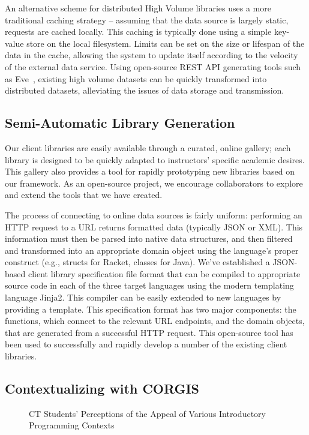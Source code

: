 An alternative scheme for distributed High Volume libraries uses a more traditional caching strategy -- assuming that the data source is largely static, requests are cached locally.
This caching is typically done using a simple key-value store on the local filesystem.
Limits can be set on the size or lifespan of the data in the cache, allowing the system to update itself according to the velocity of the external data service.
Using open-source REST API generating tools such as Eve~\cite{Eve}, existing high volume datasets can be quickly transformed into distributed datasets, alleviating the issues of data storage and transmission.

\subsection{Semi-Automatic Library Generation}

Our client libraries are easily available through a curated, online gallery; each library is designed to be quickly adapted to instructors' specific academic desires. 
This gallery also provides a tool for rapidly prototyping new libraries based on our framework.
As an open-source project, we encourage collaborators to explore and extend the tools that we have created.

The process of connecting to online data sources is fairly uniform: performing an HTTP request to a URL returns formatted data (typically JSON or XML). 
This information must then be parsed into native data structures, and then filtered and transformed into an appropriate domain object using the language's proper construct (e.g., structs for Racket, classes for Java).
We've established a JSON-based client library specification file format that can be compiled to appropriate source code in each of the three target languages using the modern templating language Jinja2. 
This compiler can be easily extended to new languages by providing a template.
This specification format has two major components: the functions, which connect to the relevant URL endpoints, and the domain objects, that are generated from a successful HTTP request. 
This open-source tool has been used to successfully and rapidly develop a number of the existing client libraries.

\subsection{Contextualizing with CORGIS}

\begin{figure}
		\begin{center}
		\end{center}
		\caption{CT Students' Perceptions of the Appeal of Various Introductory Programming Contexts}
		\label{fig-contexts-compared}
\end{figure}

